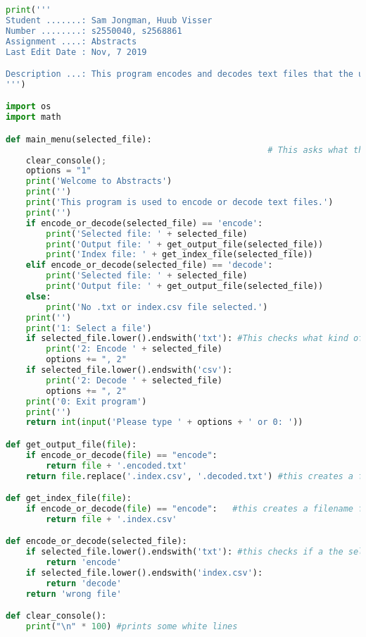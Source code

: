 \documentclass{article}
\begin{document}
\begin{lstlisting}[language=Python]
print('''
Student .......: Sam Jongman, Huub Visser
Number ........: s2550040, s2568861
Assignment ....: Abstracts
Last Edit Date : Nov, 7 2019

Description ...: This program encodes and decodes text files that the user can upload
''')

import os
import math

def main_menu(selected_file):
                                                    # This asks what the user wants to do
    clear_console();
    options = "1"
    print('Welcome to Abstracts')
    print('')
    print('This program is used to encode or decode text files.')
    print('')
    if encode_or_decode(selected_file) == 'encode':
        print('Selected file: ' + selected_file)
        print('Output file: ' + get_output_file(selected_file))
        print('Index file: ' + get_index_file(selected_file))
    elif encode_or_decode(selected_file) == 'decode':
        print('Selected file: ' + selected_file)
        print('Output file: ' + get_output_file(selected_file))
    else:
        print('No .txt or index.csv file selected.')
    print('')
    print('1: Select a file')
    if selected_file.lower().endswith('txt'): #This checks what kind of file it is, if it isn't a text file or csv file it asks agian
        print('2: Encode ' + selected_file)
        options += ", 2" 
    if selected_file.lower().endswith('csv'):
        print('2: Decode ' + selected_file)
        options += ", 2" 
    print('0: Exit program')
    print('')
    return int(input('Please type ' + options + ' or 0: '))

def get_output_file(file):
    if encode_or_decode(file) == "encode":
        return file + '.encoded.txt'
    return file.replace('.index.csv', '.decoded.txt') #this creates a filename for a save file

def get_index_file(file):
    if encode_or_decode(file) == "encode":   #this creates a filename for a save file
        return file + '.index.csv'

def encode_or_decode(selected_file):
    if selected_file.lower().endswith('txt'): #this checks if a the selected file is a txt or cvs file
        return 'encode' 
    if selected_file.lower().endswith('index.csv'):
        return 'decode' 
    return 'wrong file' 

def clear_console():
    print("\n" * 100) #prints some white lines


\end{lstlisting}
\end{document}
